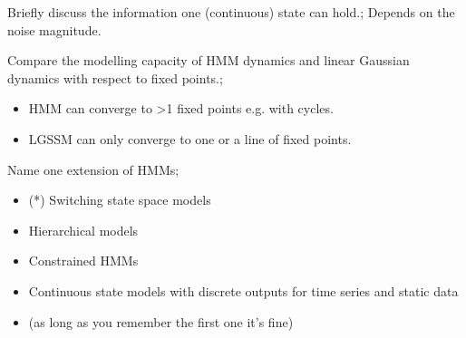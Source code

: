 \documentclass{article}
\begin{document}
Briefly discuss the  information one (continuous) state can hold.; Depends on the noise magnitude. 

Compare the modelling capacity of HMM dynamics and linear Gaussian dynamics with respect to fixed points.; \begin{itemize}
    \item HMM can converge to >1 fixed points e.g. with cycles.
    \item LGSSM can only converge to one or a line of fixed points.
\end{itemize}

Name one extension of HMMs; \begin{itemize}
    \item (*) Switching state space models
    \item Hierarchical models
    \item Constrained HMMs
    \item Continuous state models with discrete outputs for time series and static data
    \item (as long as you remember the first one it's fine)
\end{itemize}
\end{document}
